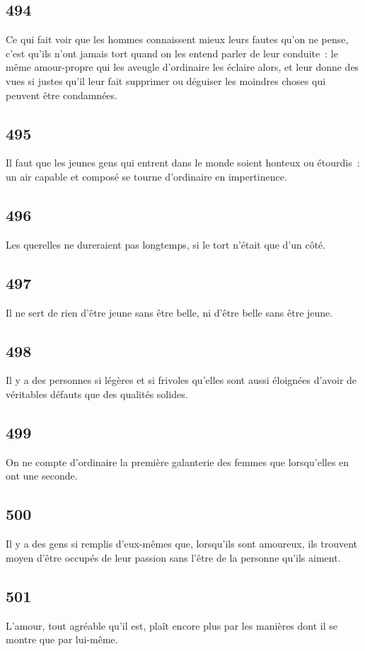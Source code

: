 \documentclass[french,twoside]{book} %
\begin{document}
\subsection[{494}]{ \textsc{494} }
\noindent Ce qui fait voir que les hommes connaissent mieux leurs fautes qu’on ne pense, c’est qu’ils n’ont jamais tort quand on les entend parler de leur conduite : le même amour-propre qui les aveugle d’ordinaire les éclaire alors, et leur donne des vues si justes qu’il leur fait supprimer ou déguiser les moindres choses qui peuvent être condamnées.
\subsection[{495}]{ \textsc{495} }
\noindent Il faut que les jeunes gens qui entrent dans le monde soient honteux ou étourdis : un air capable et composé se tourne d’ordinaire en impertinence.
\subsection[{496}]{ \textsc{496} }
\noindent Les querelles ne dureraient pas longtemps, si le tort n’était que d’un côté.
\subsection[{497}]{ \textsc{497} }
\noindent Il ne sert de rien d’être jeune sans être belle, ni d’être belle sans être jeune.
\subsection[{498}]{ \textsc{498} }
\noindent Il y a des personnes si légères et si frivoles qu’elles sont aussi éloignées d’avoir de véritables défauts que des qualités solides.
\subsection[{499}]{ \textsc{499} }
\noindent On ne compte d’ordinaire la première galanterie des femmes que lorsqu’elles en ont une seconde.
\subsection[{500}]{ \textsc{500} }
\noindent Il y a des gens si remplis d’eux-mêmes que, lorsqu’ils sont amoureux, ils trouvent moyen d’être occupés de leur passion sans l’être de la personne qu’ils aiment.
\subsection[{501}]{ \textsc{501} }
\noindent L’amour, tout agréable qu’il est, plaît encore plus par les manières dont il se montre que par lui-même.
\end{document}
